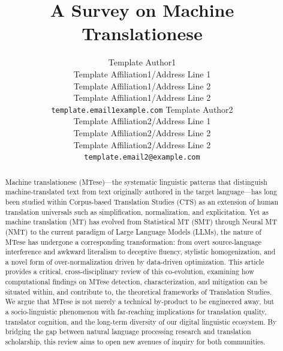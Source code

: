 \documentclass[11pt,a4paper]{article}
\title{A Survey on Machine Translationese}
\author{
  Template Author1\Thanks{The {\em actual} contributors to this instruction
    document and corresponding template file are given in Section
    \ref{sec:contributors}.} 
  \\
  Template Affiliation1/Address Line 1
  \\
  Template Affiliation1/Address Line 2
  \\
  Template Affiliation1/Address Line 2
  \\
  \texttt{template.email1example.com}
  \And
  Template Author2 
  \\
  Template Affiliation2/Address Line 1
  \\
  Template Affiliation2/Address Line 2
  \\
  Template Affiliation2/Address Line 2
  \\
  \texttt{template.email2@example.com}
}
\date{}
\begin{document}
\maketitle
\begin{abstract}

  Machine translationese (MTese)---the systematic linguistic patterns that distinguish machine-translated text from text originally authored in the target language---has long been studied within Corpus-based Translation Studies (CTS) as an extension of human translation universals such as simplification, normalization, and explicitation. Yet as machine translation (MT) has evolved from Statistical MT (SMT) through Neural MT (NMT) to the current paradigm of Large Language Models (LLMs), the nature of MTese has undergone a corresponding transformation: from overt source-language interference and awkward literalism to deceptive fluency, stylistic homogenization, and a novel form of over-normalization driven by data-driven optimization. This article provides a critical, cross-disciplinary review of this co-evolution, examining how computational findings on MTese detection, characterization, and mitigation can be situated within, and contribute to, the theoretical frameworks of Translation Studies. We argue that MTese is not merely a technical by-product to be engineered away, but a socio-linguistic phenomenon with far-reaching implications for translation quality, translator cognition, and the long-term diversity of our digital linguistic ecosystem. By bridging the gap between natural language processing research and translation scholarship, this review aims to open new avenues of inquiry for both communities.
\end{abstract}
\end{document}
